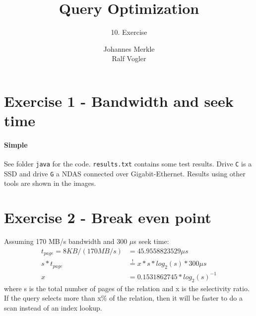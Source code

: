 \documentclass[11pt,a4paper]{scrartcl}
\begin{document}
\author{Johannes Merkle\\Ralf Vogler}
\title{Query Optimization}
\subtitle{10. Exercise}

\maketitle

\section*{Exercise 1 - Bandwidth and seek time}
\paragraph*{Simple}
See folder \verb|java| for the code. \verb|results.txt| contains some test results. Drive \verb|C| is a SSD and drive \verb|G| a NDAS connected over Gigabit-Ethernet. Results using other tools are shown in the images.




\section*{Exercise 2 - Break even point}
Assuming 170 MB/s bandwidth and 300 $\mu$s seek time:
\begin{align*}
t_{page} = 8KB / (170 MB/s) &= 45.9558823529 \mu s\\
s * t_{page} &\stackrel{!}{=} x * s * log_2(s) * 300\mu s\\
x &= 0.1531862745 * log_2(s)^{-1}
\end{align*}
where s is the total number of pages of the relation and x is the selectivity ratio.
If the query selects more than x\% of the relation, then it will be faster to do a scan instead of an index lookup.
\end{document}
